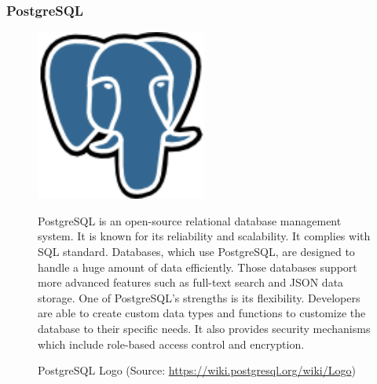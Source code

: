 \subsubsection{PostgreSQL}
\begin{figure}[H]
    \centering
    \begin{minipage}{0.35\textwidth}
        \center
        \includegraphics [width=0.5\textwidth] {images/Technologies/postgresLogo.png}
        \caption{PostgreSQL Logo (Source: \url{https://wiki.postgresql.org/wiki/Logo})}
    \end{minipage}
    \hfill
    \begin{minipage}{0.6\textwidth}
      \setlength{\baselineskip}{1.5em}
      \vspace{-1em}
      PostgreSQL is an open-source relational database management system. It is known for its reliability and scalability. It complies with SQL standard. Databases, which use PostgreSQL, are designed to handle a huge amount of data efficiently. Those databases support more advanced features such as full-text search and JSON data storage. One of PostgreSQL's strengths is its flexibility. Developers are able to create custom data types and functions to customize the database to their specific needs. It also provides security mechanisms which include role-based access control and encryption. 
    \end{minipage}
\end{figure}

\newpage